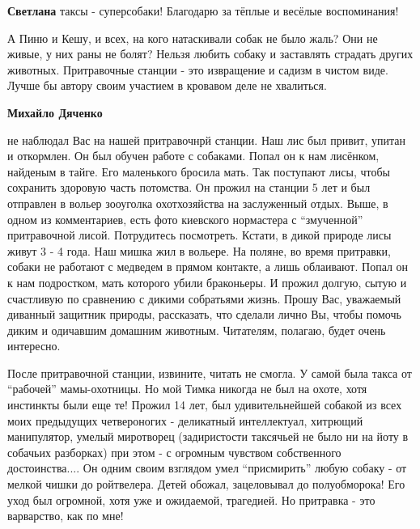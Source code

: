 \begin{itemize}
\begin{itemize} %
\textbf{Светлана} таксы - суперсобаки! Благодарю за тёплые и весёлые воспоминания!
\end{itemize} %


А Пиню и Кешу, и всех, на кого натаскивали собак не было жаль? Они не живые, у
них раны не болят? Нельзя любить собаку и заставлять страдать других животных.
Притравочные станции - это извращение и садизм в чистом виде. Лучше бы автору
своим участием в кровавом деле не хвалиться.

\begin{itemize} %
\textbf{Михайло Дяченко} 

не наблюдал Вас на нашей притравочнрй станции. Наш лис был привит, упитан и
откормлен. Он был обучен работе с собаками. Попал он к нам лисёнком, найденым в
тайге. Его маленького бросила мать. Так поступают лисы, чтобы сохранить
здоровую часть потомства. Он прожил на станции 5 лет и был отправлен в вольер
зооуголка охотхозяйства на заслуженный отдых. Выше, в одном из комментариев,
есть фото киевского нормастера с \enquote{змученной} притравочной лисой. Потрудитесь
посмотреть. Кстати, в дикой природе лисы живут 3 - 4 года. Наш мишка жил в
вольере. На поляне, во время притравки, собаки не работают с медведем в прямом
контакте, а лишь облаивают. Попал он к нам подростком, мать которого убили
браконьеры. И прожил долгую, сытую и счастливую по сравнению с дикими
собратьями жизнь. Прошу Вас, уважаемый диванный защитник природы, рассказать,
что сделали лично Вы, чтобы помочь диким и одичавшим домашним животным.
Читателям, полагаю, будет очень интересно.

\end{itemize} %


После притравочной станции, извините, читать не смогла. У самой была такса от
\enquote{рабочей} мамы-охотницы. Но мой Тимка никогда не был на охоте, хотя инстинкты
были еще те! Прожил 14 лет, был удивительнейшей собакой из всех моих предыдущих
четвероногих - деликатный интеллектуал, хитрющий манипулятор, умелый миротворец
(задиристости таксячьей не было ни на йоту в собачьих разборках) при этом - с
огромным чувством собственного достоинства.... Он одним своим взглядом умел
\enquote{присмирить} любую собаку - от мелкой чишки до ройтвелера. Детей обожал,
зацеловывал до полуобморока! Его уход был огромной, хотя уже и
ожидаемой, трагедией. Но притравка - это варварство, как по мне!


\end{itemize}
